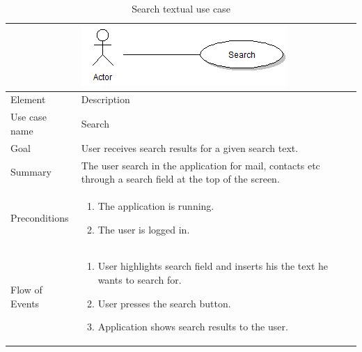 \begin{table}
\begin{tabular}{p{3cm}p{12cm}}
& \includegraphics{search}\\ \hline
Element & Description \\ \hline
Use case name & Search \\
Goal & User receives search results for a given search text. \\
Summary & The user search in the application for mail, contacts etc through a search field at the top of the screen. \\
Preconditions &
\begin{enumerate}
\item{}The application is running.
\item{}The user is logged in.
\end{enumerate} \\ \hline
Flow of Events &
\begin{enumerate}
\item{}User highlights search field and inserts his the text he wants to search for.
\item{}User presses the search button.
\item{}Application shows search results to the user.
\end{enumerate}
\end{tabular}
\caption{Search textual use case} \label{tab:search}
\end{table}

